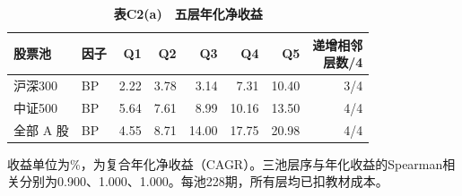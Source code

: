 \begingroup\small\setlength{\tabcolsep}{4pt}
\begin{table}[H]\centering
\caption*{\textbf{表C2(a)　五层年化净收益}}
\begin{tabular*}{\textwidth}{@{\extracolsep{\fill}}llrrrrrr@{}}\toprule
股票池 & 因子 & Q1 & Q2 & Q3 & Q4 & Q5 & \makecell{递增相邻\\层数/4} \\ \midrule
沪深300 & BP & 2.22 & 3.78 & 3.14 & 7.31 & 10.40 & 3/4 \\
中证500 & BP & 5.64 & 7.61 & 8.99 & 10.16 & 13.50 & 4/4 \\
全部 A 股 & BP & 4.55 & 8.71 & 14.00 & 17.75 & 20.98 & 4/4 \\
\bottomrule\end{tabular*}
\par\smallskip\raggedright\footnotesize 收益单位为\%，为复合年化净收益（CAGR）。三池层序与年化收益的Spearman相关分别为0.900、1.000、1.000。每池228期，所有层均已扣教材成本。\end{table}
\endgroup
